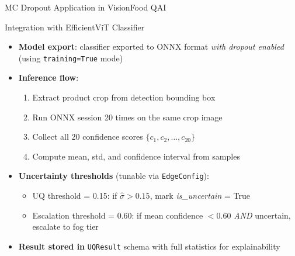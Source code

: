 \documentclass[10pt]{beamer}
\begin{document}
\begin{frame}{MC Dropout Application in VisionFood QAI}

\small
\begin{block}{Integration with EfficientViT Classifier}
\begin{itemize}\setlength{\itemsep}{6pt}
    \item \textbf{Model export}: classifier exported to ONNX format \textit{with dropout enabled} (using \texttt{training=True} mode)
    \item \textbf{Inference flow}:
    \begin{enumerate}
        \item Extract product crop from detection bounding box
        \item Run ONNX session 20 times on the same crop image
        \item Collect all 20 confidence scores $\{c_1, c_2, \ldots, c_{20}\}$
        \item Compute mean, std, and confidence interval from samples
    \end{enumerate}
    \item \textbf{Uncertainty thresholds} (tunable via \texttt{EdgeConfig}):
    \begin{itemize}
        \item UQ threshold = 0.15: if $\hat{\sigma} > 0.15$, mark \textit{is\_uncertain} = True
        \item Escalation threshold = 0.60: if mean confidence $< 0.60$ \textit{AND} uncertain, escalate to fog tier
    \end{itemize}
    \item \textbf{Result stored in} \texttt{UQResult} schema with full statistics for explainability
\end{itemize}
\end{block}

\end{frame}
\end{document}
